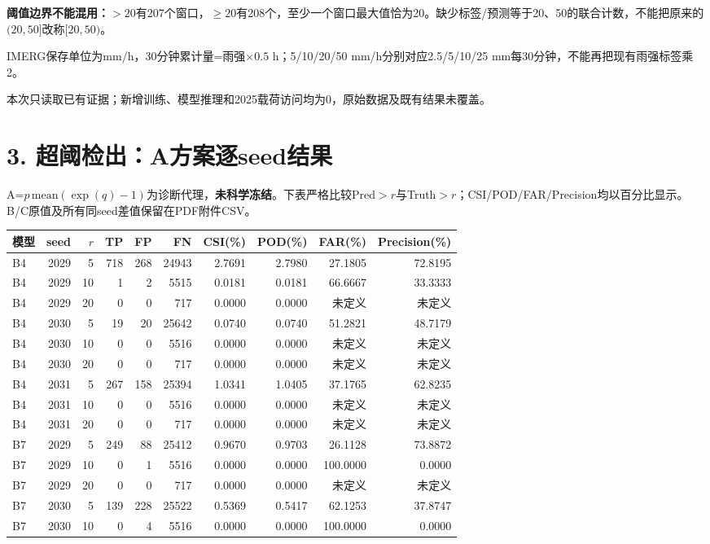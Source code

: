 \documentclass[UTF8,a4paper,10pt,fontset=none]{ctexart}
\newcommand{\result}[1]{\textcolor{ink}{\textbf{#1}}}
\begin{document}
\result{阈值边界不能混用：}$>20$有207个窗口，$\ge20$有208个，至少一个窗口最大值恰为20。缺少标签/预测等于20、50的联合计数，不能把原来的$(20,50]$改称$[20,50)$。

IMERG保存单位为mm/h，30分钟累计量=雨强$\times0.5$ h；5/10/20/50 mm/h分别对应2.5/5/10/25 mm每30分钟，不能再把现有雨强标签乘2。

本次只读取已有证据；新增训练、模型推理和2025载荷访问均为0，原始数据及既有结果未覆盖。
\newpage
\section*{3. 超阈检出：A方案逐seed结果}
A=$p\,\mathrm{mean}(\exp(q)-1)$为诊断代理，\textbf{未科学冻结}。下表严格比较Pred$>r$与Truth$>r$；CSI/POD/FAR/Precision均以百分比显示。B/C原值及所有同seed差值保留在PDF附件CSV。
\begin{center}
\footnotesize
\begin{tabular}{@{}lrrrrrrrrr@{}}
\toprule
模型 & seed & $r$ & TP & FP & FN & CSI(\%) & POD(\%) & FAR(\%) & Precision(\%) \\
\midrule
B4 & 2029 & 5 & 718 & 268 & 24943 & 2.7691 & 2.7980 & 27.1805 & 72.8195 \\
B4 & 2029 & 10 & 1 & 2 & 5515 & 0.0181 & 0.0181 & 66.6667 & 33.3333 \\
B4 & 2029 & 20 & 0 & 0 & 717 & 0.0000 & 0.0000 & 未定义 & 未定义 \\
B4 & 2030 & 5 & 19 & 20 & 25642 & 0.0740 & 0.0740 & 51.2821 & 48.7179 \\
B4 & 2030 & 10 & 0 & 0 & 5516 & 0.0000 & 0.0000 & 未定义 & 未定义 \\
B4 & 2030 & 20 & 0 & 0 & 717 & 0.0000 & 0.0000 & 未定义 & 未定义 \\
B4 & 2031 & 5 & 267 & 158 & 25394 & 1.0341 & 1.0405 & 37.1765 & 62.8235 \\
B4 & 2031 & 10 & 0 & 0 & 5516 & 0.0000 & 0.0000 & 未定义 & 未定义 \\
B4 & 2031 & 20 & 0 & 0 & 717 & 0.0000 & 0.0000 & 未定义 & 未定义 \\
B7 & 2029 & 5 & 249 & 88 & 25412 & 0.9670 & 0.9703 & 26.1128 & 73.8872 \\
B7 & 2029 & 10 & 0 & 1 & 5516 & 0.0000 & 0.0000 & 100.0000 & 0.0000 \\
B7 & 2029 & 20 & 0 & 0 & 717 & 0.0000 & 0.0000 & 未定义 & 未定义 \\
B7 & 2030 & 5 & 139 & 228 & 25522 & 0.5369 & 0.5417 & 62.1253 & 37.8747 \\
B7 & 2030 & 10 & 0 & 4 & 5516 & 0.0000 & 0.0000 & 100.0000 & 0.0000 \\

\end{tabular}
\end{center}
\end{document}
